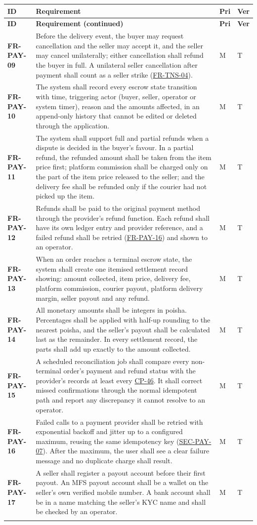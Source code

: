 \documentclass[11pt,a4paper]{report}
\makeatletter
\newenvironment{reqs}{%
  \small
  \begin{longtable}{@{}>{\raggedright\arraybackslash}p{2.35cm}
                       >{\raggedright\arraybackslash}p{10.3cm}
                       >{\centering\arraybackslash}p{0.7cm}
                       >{\centering\arraybackslash}p{0.7cm}@{}}
  \toprule
  \textbf{ID} & \textbf{Requirement} & \textbf{Pri} & \textbf{Ver} \\
  \midrule
  \endfirsthead
  \toprule
  \textbf{ID} & \textbf{Requirement (continued)} & \textbf{Pri} & \textbf{Ver} \\
  \midrule
  \endhead
  \bottomrule
  \endfoot
}{\end{longtable}}
\newcommand{\req}[5]{\leavevmode\textbf{#1}\hypertarget{#1}{} & #5 & #2 & #3 \\ \addlinespace[2pt]}
\newcommand{\rr}[1]{\hyperlink{#1}{#1}}
\newcommand{\cp}[1]{\hyperlink{#1}{#1}}
\makeatother
\begin{document}
\begin{reqs}
\req{FR-PAY-09}{M}{T}{new}{Before the delivery event, the buyer may request cancellation and the seller may accept it, and the seller may cancel unilaterally; either cancellation shall refund the buyer in full. A unilateral seller cancellation after payment shall count as a seller strike (\rr{FR-TNS-04}).}
\req{FR-PAY-10}{M}{T}{FR-44}{The system shall record every escrow state transition with time, triggering actor (buyer, seller, operator or system timer), reason and the amounts affected, in an append-only history that cannot be edited or deleted through the application.}
\req{FR-PAY-11}{M}{T}{FR-45}{The system shall support full and partial refunds when a dispute is decided in the buyer's favour. In a partial refund, the refunded amount shall be taken from the item price first; platform commission shall be charged only on the part of the item price released to the seller; and the delivery fee shall be refunded only if the courier had not picked up the item.}
\req{FR-PAY-12}{M}{T}{new}{Refunds shall be paid to the original payment method through the provider's refund function. Each refund shall have its own ledger entry and provider reference, and a failed refund shall be retried (\rr{FR-PAY-16}) and shown to an operator.}
\req{FR-PAY-13}{M}{T}{FR-46}{When an order reaches a terminal escrow state, the system shall create one itemised settlement record showing: amount collected, item price, delivery fee, platform commission, courier payout, platform delivery margin, seller payout and any refund.}
\req{FR-PAY-14}{M}{T}{new}{All monetary amounts shall be integers in poisha. Percentages shall be applied with half-up rounding to the nearest poisha, and the seller's payout shall be calculated last as the remainder. In every settlement record, the parts shall add up exactly to the amount collected.}
\req{FR-PAY-15}{M}{T}{FR-47, NFR-10}{A scheduled reconciliation job shall compare every non-terminal order's payment and refund status with the provider's records at least every \cp{CP-46}. It shall correct missed confirmations through the normal idempotent path and report any discrepancy it cannot resolve to an operator.}
\req{FR-PAY-16}{M}{T}{FR-48, NFR-9}{Failed calls to a payment provider shall be retried with exponential backoff and jitter up to a configured maximum, reusing the same idempotency key (\rr{SEC-PAY-07}). After the maximum, the user shall see a clear failure message and no duplicate charge shall result.}
\req{FR-PAY-17}{M}{T}{new}{A seller shall register a payout account before their first payout. An MFS payout account shall be a wallet on the seller's own verified mobile number. A bank account shall be in a name matching the seller's KYC name and shall be checked by an operator.}

\end{reqs}
\end{document}
